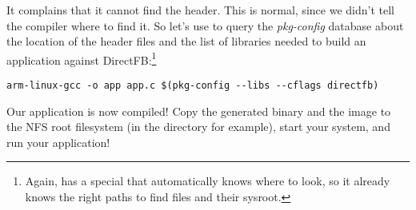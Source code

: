 It complains that it cannot find the  header. This is
normal, since we didn't tell the compiler where to find it. So let's
use  to query the {\em pkg-config} database about the
location of the header files and the list of libraries needed to build
an application against DirectFB:\footnote{Again,
 has a special  that
automatically knows where to look, so it already knows the right paths
to find  files and their sysroot.}

\footnotesize
\begin{verbatim}
arm-linux-gcc -o app app.c $(pkg-config --libs --cflags directfb)
\end{verbatim}
\normalsize

Our application is now compiled! Copy the generated binary and the
 image to the NFS root filesystem (in the
 directory for example), start your system, and run your
application!
